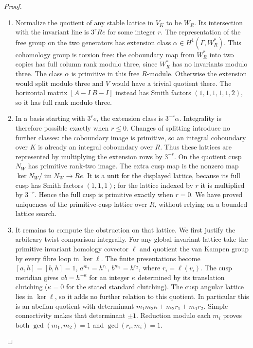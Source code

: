 \documentclass[11pt,a4paper]{article}
\theoremstyle{definition}
\begin{document}
\begin{proof}
\begin{enumerate}[label=\arabic*.]
\item Normalize the quotient of any stable lattice in $V_K$ to
be $W_R$.  Its intersection with the invariant line is
$3^rRe$ for some integer $r$.
The representation of the free group on the two generators
has extension class
$\alpha\in H^1(\Gamma,W_R^*)$.
This cohomology group is torsion free: the coboundary map
from $W_R^*$ into two copies has full column rank modulo
three, since $W_R^*$ has no invariants modulo three.
The class $\alpha$ is primitive in this free $R$-module.
Otherwise the extension would split modulo three and $V$
would have a trivial quotient there.  The horizontal
matrix $[A-I\ B-I]$ instead has Smith factors
$(1,1,1,1,1,2)$, so it has full rank modulo three.

\item In a basis starting with $3^re$, the extension class is
$3^{-r}\alpha$.  Integrality is therefore possible exactly
when $r\leq0$.  Changes of splitting introduce no further
classes: the coboundary image is primitive, so an integral
coboundary over $K$ is already an integral coboundary over
$R$.  Thus these lattices are represented by multiplying
the extension rows by $3^{-r}$.
On the quotient cusp $N_W$ has primitive rank-two image.
The extra cusp map is the nonzero map
$\ker N_W/\operatorname{im}N_W\to Re$.
It is a unit for the displayed lattice, because its full
cusp has Smith factors $(1,1,1)$; for the lattice indexed
by $r$ it is multiplied by $3^{-r}$.
Hence the full cusp is primitive exactly when $r=0$.
We have proved uniqueness of the primitive-cusp lattice
over $R$, without relying on a bounded lattice search.

\item It remains to compute the obstruction on that lattice.
We first justify the arbitrary-twist comparison integrally.
For any global invariant lattice take the primitive invariant
homology covector $\ell$ and quotient the van Kampen group
by every fibre loop in $\ker\ell$.
The finite presentations become
$[a,h]=[b,h]=1$, $a^{m_1}=h^{r_1}$,
$b^{m_2}=h^{r_2}$, where $r_i=\ell(v_i)$.
The cusp meridian gives $ab=h^{-\kappa}$ for an integer
$\kappa$ determined by its translation clutching
($\kappa=0$ for the stated standard clutching).
The cusp angular lattice lies in $\ker\ell$, so it adds
no further relation to this quotient.  In particular this
is an abelian quotient with determinant
$m_1m_2\kappa+m_2r_1+m_1r_2$.
Simple connectivity makes that determinant $\pm1$.
Reduction modulo each $m_i$ proves both
$\gcd(m_1,m_2)=1$ and $\gcd(r_i,m_i)=1$.


\end{enumerate}
\end{proof}
\end{document}
